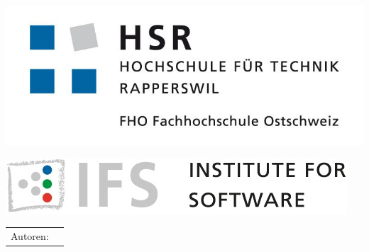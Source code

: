 

\begin{titlepage}

\begin{center}
\begin{minipage}[t]{0.45\textwidth}
    \includegraphics[width=\textwidth]{start/img/hsrLogo}
\end{minipage}
\hspace{\fill} %
\begin{minipage}[t]{0.45\textwidth}
    \vspace{-2.56cm}
    \includegraphics[width=\textwidth]{start/img/ifsLogo}
\end{minipage}

\end{center}

\vspace{15ex} %
\Huge
\textbf{\titel}

\huge
\textbf{\subtitel}

\vspace{4ex}
\textbf{\work}

\vspace{1ex}
\LARGE 
\place

\vspace{5ex}
\timeperiod

\vspace{11ex}
\begin{tabular}{ll} %
	Autoren:        & \authors    \\
\end{tabular}

\end{titlepage}

\restoregeometry %
